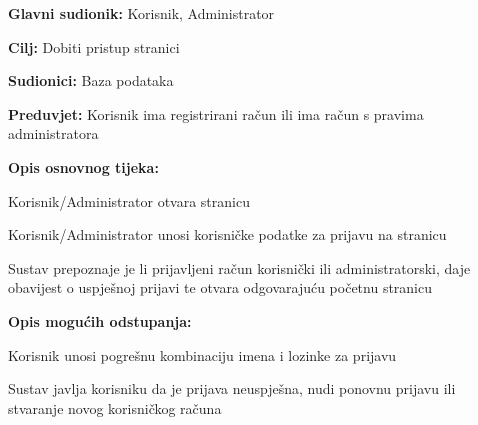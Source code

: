 					\noindent {}
					\begin{packed_item}
				
				\item \textbf{Glavni sudionik: } Korisnik, Administrator
				\item  \textbf{Cilj:} Dobiti pristup stranici
				\item  \textbf{Sudionici:} Baza podataka
				\item  \textbf{Preduvjet:} Korisnik ima registrirani račun ili ima račun s pravima administratora
				\item  \textbf{Opis osnovnog tijeka:}
				
				\item[] \begin{packed_enum}
					
					\item Korisnik/Administrator otvara stranicu
					\item Korisnik/Administrator unosi korisničke podatke za prijavu na stranicu
					\item Sustav prepoznaje je li prijavljeni račun korisnički ili administratorski, daje obavijest o uspješnoj prijavi te otvara odgovarajuću početnu stranicu
				\end{packed_enum}
				
				\item  \textbf{Opis mogućih odstupanja:}
				
				\item[] \begin{packed_item}
					
					\item[2.a] Korisnik unosi pogrešnu kombinaciju imena i lozinke za prijavu
					\item[] \begin{packed_enum}
						
						\item Sustav javlja korisniku da je prijava neuspješna, nudi ponovnu prijavu ili stvaranje
						novog korisničkog računa
					\end{packed_enum}
					
					
				\end{packed_item}
			\end{packed_item}
			
